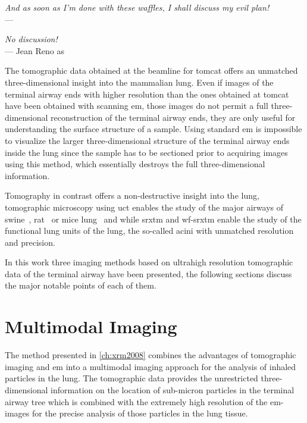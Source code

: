 \acresetall
{}\label{ch:discussion}
\begin{flushright}{\slshape And as soon as I'm done with these waffles, I shall discuss my evil plan!} \\ \medskip
	---  \citep{Zim}
\end{flushright}
\begin{flushright}{\slshape No discussion!} \\ \medskip
	--- Jean Reno as \citep{Leon}
\end{flushright}
\vspace{52mm}
The tomographic data obtained at the beamline for \ac{tomcat} offers an unmatched three-dimensional insight into the mammalian lung. Even if images of the terminal airway ends with higher resolution than the ones obtained at \ac{tomcat} have been obtained with scanning \ac{em}, those images do not permit a full three-dimensional reconstruction of the terminal airway ends, they are only useful for understanding the surface structure of a sample. Using standard \ac{em} is impossible to visualize the larger three-dimensional structure of the terminal airway ends inside the lung since the sample has to be sectioned prior to acquiring images using this method, which essentially destroys the full three-dimensional information.

Tomography in contrast offers a non-destructive insight into the lung, tomographic microscopy using \ac{uct} enables the study of the major airways of swine~\cite{Litzlbauer2006}, rat~\cite{Langheinrich2004a,Sharif2010} or mice lung~\cite{Langheinrich2004,Ritman2005} and while \ac{srxtm} and \ac{wf-srxtm} enable the study of the functional lung units of the lung, the so-called acini with unmatched resolution and precision.

In this work three imaging methods based on ultrahigh resolution tomographic data of the terminal airway have been presented, the following sections discuss the major notable points of each of them.

\section{Multimodal Imaging}
The method presented in \autoref{ch:xrm2008} combines the advantages of tomographic imaging and \ac{em} into a multimodal imaging approach for the analysis of inhaled particles in the lung. The tomographic data provides the unrestricted three-dimensional information on the location of sub-micron particles in the terminal airway tree which is combined with the extremely high resolution of the \ac{em}-images for the precise analysis of those particles in the lung tissue.

